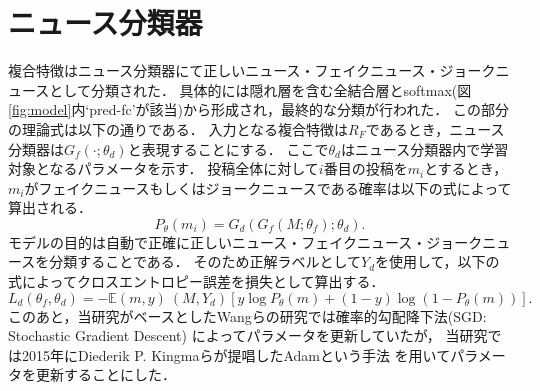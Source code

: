 \section{ニュース分類器}
%
複合特徴はニュース分類器にて正しいニュース・フェイクニュース・ジョークニュースとして分類された．
具体的には隠れ層を含む全結合層とsoftmax(図\ref{fig:model}内`pred-fc'が該当)から形成され，最終的な分類が行われた．
この部分の理論式は以下の通りである．
入力となる複合特徴は$R_F$であるとき，ニュース分類器は$G_f(\cdot; \theta_d)$と表現することにする．
ここで$\theta_d$はニュース分類器内で学習対象となるパラメータを示す．
投稿全体に対して$i$番目の投稿を$m_i$とするとき，
$m_i$がフェイクニュースもしくはジョークニュースである確率は以下の式によって算出される．
\begin{equation}
    \label{eq:news_classify}
    P_\theta(m_i) = G_d(G_f(M; \theta_f); \theta_d).
\end{equation}
モデルの目的は自動で正確に正しいニュース・フェイクニュース・ジョークニュースを分類することである．
そのため正解ラベルとして$Y_d$を使用して，以下の式によってクロスエントロピー誤差を損失として算出する．
\begin{equation}
    \label{eq:cross_entropy}
    L_d(\theta_f, \theta_d) = -\mathbb{E}{(m,y)~(M, Y_d)}[y\log P_\theta(m) + (1-y)\log (1-P_\theta(m))].
\end{equation}
このあと，当研究がベースとしたWangらの研究では確率的勾配降下法(SGD: Stochastic Gradient Descent)
によってパラメータを更新していたが，
当研究では2015年にDiederik P. Kingmaらが提唱したAdamという手法\cite{DBLP:journals/corr/KingmaB14}
を用いてパラメータを更新することにした．
%

